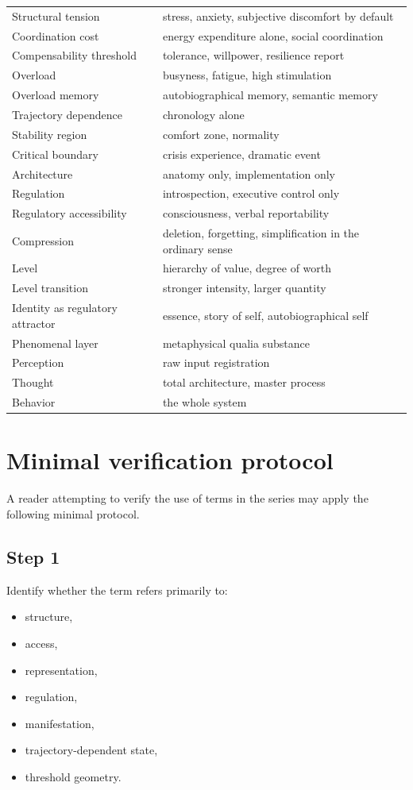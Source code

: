 \documentclass[11pt,a4paper]{article}
\begin{document}
\begin{longtable}{>{\RaggedRight\arraybackslash}p{} >{\RaggedRight\arraybackslash}p{}}
		Structural tension & stress, anxiety, subjective discomfort by default \\
		Coordination cost & energy expenditure alone, social coordination \\
		Compensability threshold & tolerance, willpower, resilience report \\
		Overload & busyness, fatigue, high stimulation \\
		Overload memory & autobiographical memory, semantic memory \\
		Trajectory dependence & chronology alone \\
		Stability region & comfort zone, normality \\
		Critical boundary & crisis experience, dramatic event \\
		Architecture & anatomy only, implementation only \\
		Regulation & introspection, executive control only \\
		Regulatory accessibility & consciousness, verbal reportability \\
		Compression & deletion, forgetting, simplification in the ordinary sense \\
		Level & hierarchy of value, degree of worth \\
		Level transition & stronger intensity, larger quantity \\
		Identity as regulatory attractor & essence, story of self, autobiographical self \\
		Phenomenal layer & metaphysical qualia substance \\
		Perception & raw input registration \\
		Thought & total architecture, master process \\
		Behavior & the whole system \\
		\bottomrule
	\end{longtable}
	
	\section{Minimal verification protocol}
	
	A reader attempting to verify the use of terms in the series may apply the following minimal protocol.
	
	\subsection*{Step 1}
	Identify whether the term refers primarily to:
	\begin{itemize}[leftmargin=2em]
		\item structure,
		\item access,
		\item representation,
		\item regulation,
		\item manifestation,
		\item trajectory-dependent state,
		\item threshold geometry.
	\end{itemize}
	
\end{document}
